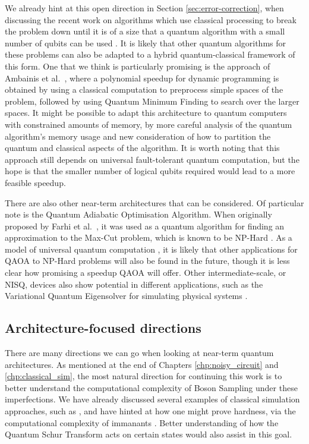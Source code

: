We already hint at this open direction in Section \ref{sec:error-correction}, when discussing the recent work on algorithms which use classical processing to break the problem down until it is of a size that a quantum algorithm with a small number of qubits can be used \cite{dunjko2018, ge2019}. It is likely that other quantum algorithms for these problems can also be adapted to a hybrid quantum-classical framework of this form. One that we think is particularly promising is the approach of Ambainis et al.~\cite{ambainis2018}, where a polynomial speedup for dynamic programming is obtained by using a classical computation to preprocess simple spaces of the problem, followed by using Quantum Minimum Finding to search over the larger spaces. It might be possible to adapt this architecture to quantum computers with constrained amounts of memory, by more careful analysis of the quantum algorithm's memory usage and new consideration of how to partition the quantum and classical aspects of the algorithm. It is worth noting that this approach still depends on universal fault-tolerant quantum computation, but the hope is that the smaller number of logical qubits required would lead to a more feasible speedup.

There are also other near-term architectures that can be considered. Of particular note is the Quantum Adiabatic Optimisation Algorithm. When originally proposed by Farhi et al.~\cite{farhi2014}, it was used as a quantum algorithm for finding an approximation to the Max-Cut problem, which is known to be NP-Hard \cite{karp1972}. As a model of universal quantum computation \cite{lloyd2018, morales2019}, it is likely that other applications for QAOA to NP-Hard problems will also be found in the future, though it is less clear how promising a speedup QAOA will offer. Other intermediate-scale, or NISQ, devices also show potential in different applications, such as the Variational Quantum Eigensolver for simulating physical systems \cite{peruzzo2014, preskill2018}.

\subsection{Architecture-focused directions}

There are many directions we can go when looking at near-term quantum architectures. As mentioned at the end of Chapters \ref{chp:noisy_circuit} and \ref{chp:classical_sim}, the most natural direction for continuing this work is to better understand the computational complexity of Boson Sampling under these imperfections. We have already discussed several examples of classical simulation approaches, such as \cite{renema2018, renema2018loss, garciapatron2017, oszmaniec2018, brod2019}, and have hinted at how one might prove hardness, via the computational complexity of immanants \cite{hartmann1985, barvinok1990, burgisser2000, burgisser2000immanants, mertens2013}. Better understanding of how the Quantum Schur Transform acts on certain states would also assist in this goal.

